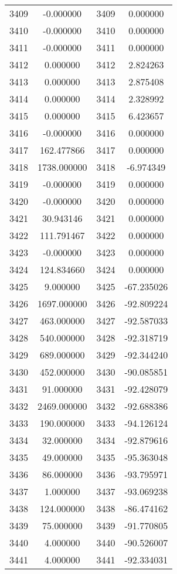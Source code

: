 \documentclass[12pt]{article}
\begin{document}
\begin{longtable}{@{}cccc@{}}
3409 & -0.000000 & 3409 & 0.000000 \\
3410 & -0.000000 & 3410 & 0.000000 \\
3411 & -0.000000 & 3411 & 0.000000 \\
3412 & 0.000000 & 3412 & 2.824263 \\
3413 & 0.000000 & 3413 & 2.875408 \\
3414 & 0.000000 & 3414 & 2.328992 \\
3415 & 0.000000 & 3415 & 6.423657 \\
3416 & -0.000000 & 3416 & 0.000000 \\
3417 & 162.477866 & 3417 & 0.000000 \\
3418 & 1738.000000 & 3418 & -6.974349 \\
3419 & -0.000000 & 3419 & 0.000000 \\
3420 & -0.000000 & 3420 & 0.000000 \\
3421 & 30.943146 & 3421 & 0.000000 \\
3422 & 111.791467 & 3422 & 0.000000 \\
3423 & -0.000000 & 3423 & 0.000000 \\
3424 & 124.834660 & 3424 & 0.000000 \\
3425 & 9.000000 & 3425 & -67.235026 \\
3426 & 1697.000000 & 3426 & -92.809224 \\
3427 & 463.000000 & 3427 & -92.587033 \\
3428 & 540.000000 & 3428 & -92.318719 \\
3429 & 689.000000 & 3429 & -92.344240 \\
3430 & 452.000000 & 3430 & -90.085851 \\
3431 & 91.000000 & 3431 & -92.428079 \\
3432 & 2469.000000 & 3432 & -92.688386 \\
3433 & 190.000000 & 3433 & -94.126124 \\
3434 & 32.000000 & 3434 & -92.879616 \\
3435 & 49.000000 & 3435 & -95.363048 \\
3436 & 86.000000 & 3436 & -93.795971 \\
3437 & 1.000000 & 3437 & -93.069238 \\
3438 & 124.000000 & 3438 & -86.474162 \\
3439 & 75.000000 & 3439 & -91.770805 \\
3440 & 4.000000 & 3440 & -90.526007 \\
3441 & 4.000000 & 3441 & -92.334031 \\

\end{longtable}
\end{document}
